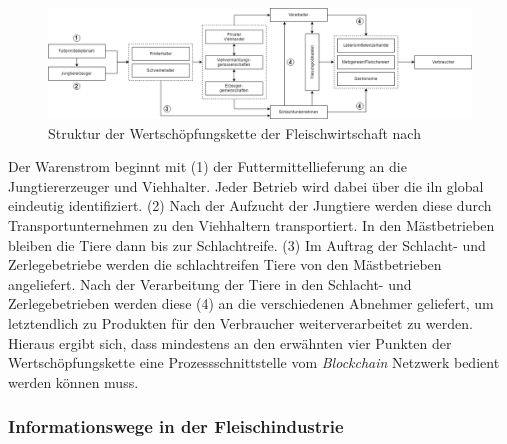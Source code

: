     \begin{figure}[h!]
        \centering
        \includegraphics[angle=90, width=0.3\linewidth]{pictures/structure-value-chain-meat-industry-numbered}
        \caption[Struktur der Wertschöpfungskette der Fleischwirtschaft]{Struktur der Wertschöpfungskette der Fleischwirtschaft nach \citet{Petersen2010, Voss2010, Beck2008}}
        \label{fig:structure-value-chain-meat-industry-numbered}
    \end{figure}

\noindent
Der Warenstrom beginnt mit (1) der Futtermittellieferung an die Jungtiererzeuger und Viehhalter. Jeder Betrieb wird dabei über die \ac{iln} global eindeutig identifiziert. (2) Nach der Aufzucht der Jungtiere werden diese durch Transportunternehmen zu den Viehhaltern transportiert. In den Mästbetrieben bleiben die Tiere dann bis zur Schlachtreife. (3) Im Auftrag der Schlacht- und Zerlegebetriebe werden die schlachtreifen Tiere von den Mästbetrieben angeliefert. Nach der Verarbeitung der Tiere in den Schlacht- und Zerlegebetrieben werden diese (4) an die verschiedenen Abnehmer geliefert, um letztendlich zu Produkten für den Verbraucher weiterverarbeitet zu werden. Hieraus ergibt sich, dass mindestens an den erwähnten vier Punkten der Wertschöpfungskette eine Prozessschnittstelle vom \textit{Blockchain} Netzwerk bedient werden können muss.

\subsubsection{Informationswege in der Fleischindustrie}

